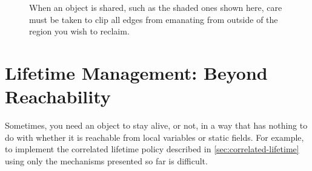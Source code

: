 \begin{figure}
\centering
{}
\qquad
{}
	\caption{When an object is shared, such as the shaded ones shown
	here, care must be taken to clip all edges from emanating from outside of the
	region you wish to reclaim.}
	\label{fig:reachability-sharing}
\end{figure}

\section{Lifetime Management: Beyond Reachability}
Sometimes, you need an object to stay alive, or not, in a way that has nothing
to do with whether it is reachable from local variables or static fields. For
example, to implement the correlated lifetime policy described in
\autoref{sec:correlated-lifetime} using only the mechanisms presented so far is
difficult. 


